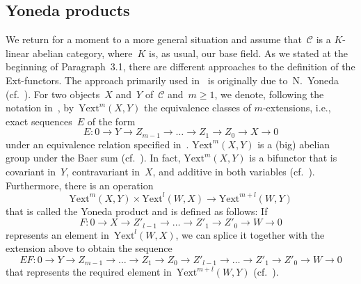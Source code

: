 \documentclass[12pt]{article}
\theoremstyle{definition}
\theoremstyle{break}
\newcommand{\CC}{\mathcal{C}}
\newcommand{\Yext}{\mathrm{Yext}}
\renewcommand{\1}{\mathbbm{1}}
\begin{document}
\subsection{Yoneda products} \label{YonProd}
We return for a moment to a more general situation and assume that~$\CC$ is a \mbox{$K$-linear} abelian category, where~$K$ is, as usual, our base field. As we stated at the beginning of Paragraph~3.1, there are different approaches to the definition of the Ext-functors. The approach primarily used in~\cite{Mi} is originally due to~N.~Yoneda (cf.~\cite{Y}). For two objects~$X$ and~$Y$ of~$\CC$ and~$m \ge 1$, we denote, following the notation in~\cite[Chap.~IV, Sec.~9, p.~148ff]{HiS}, by~$\Yext^m(X,Y)$ the equivalence classes of $m$-extensions, i.e., exact sequences~$E$ of the form
\[E \colon 0 \to Y \to Z_{m-1} \to \dots \to Z_1 \to Z_0 \to X \to 0\]
under an equivalence relation specified in~\cite[Chap.~VII, \S~3, p.~172]{Mi}.
$\Yext^m(X,Y)$ is a (big) abelian group under the Baer sum (cf.~\cite[Chap.~VII, Thm.~3.3, p.~174]{Mi}). In fact, $\Yext^m(X,Y)$ is a bifunctor that is covariant in~$Y$, contravariant in~$X$, and additive in both variables (cf.~\cite[Chap.~VII, \S~3, p.~175]{Mi}). Furthermore, there is an operation
\[\Yext^m(X,Y) \times \Yext^l(W,X) \to \Yext^{m+l}(W,Y)\]
that is called the Yoneda product and is defined as follows: If
\[F \colon 0 \to X \to Z'_{l-1} \to \dots \to Z'_1 \to Z'_0 \to W \to 0\]
represents an element in~$\Yext^l(W,X)$, we can splice it together with the extension above to obtain the sequence
\[EF \colon 0 \to Y \to Z_{m-1} \to \dots \to Z_1 \to Z_0 \to Z'_{l-1} \to \dots \to Z'_1 \to Z'_0 \to W \to 0\]
that represents the required element in~$\Yext^{m+l}(W,Y)$ (cf.~\cite[p.~171]{Mi}).
\end{document}
